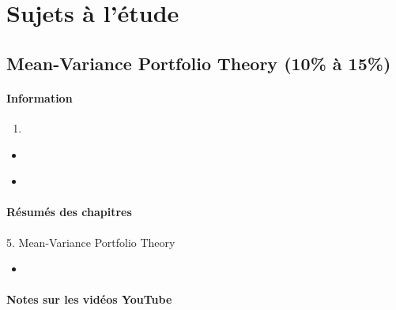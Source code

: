 \documentclass[12pt, titlepage, french]{report}
\begin{document}
\part*{Sujets à l'étude}

\chapter[Mean-Variance Portfolio Theory]{Mean-Variance Portfolio Theory (10\% à 15\%)}

\subsection{Information}

\begin{distributions}[Objective]

\end{distributions}

\begin{outcomes}
\begin{enumerate}
	\item	
\end{enumerate}
\end{outcomes}

\begin{ASM_chapter}
\begin{itemize}
	\item	{}
\end{itemize}
\end{ASM_chapter}

\begin{YTB_vids}
\begin{itemize}
	\item	
\end{itemize}
\end{YTB_vids}

\subsection{Résumés des chapitres}

\begin{CHPT_SUMM_AUTO}[label = {L.-5}]{5. Mean-Variance Portfolio Theory}
	\begin{itemize}
		\item	
	\end{itemize}
\end{CHPT_SUMM_AUTO}

\subsection{Notes sur les vidéos YouTube}
\end{document}
